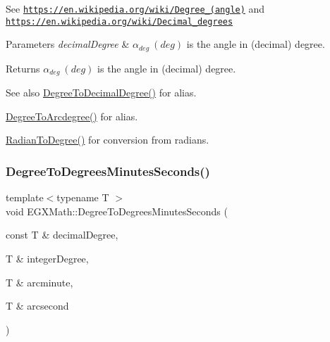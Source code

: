 See \href{https://en.wikipedia.org/wiki/Degree_(angle)}{\tt https\+://en.\+wikipedia.\+org/wiki/\+Degree\+\_\+(angle)} and \href{https://en.wikipedia.org/wiki/Decimal_degrees}{\tt https\+://en.\+wikipedia.\+org/wiki/\+Decimal\+\_\+degrees} 
\begin{DoxyParams}{Parameters}
{\em decimal\+Degree} & $\alpha_{deg}\ (deg)$ is the angle in (decimal) degree. \\
\hline
\end{DoxyParams}
\begin{DoxyReturn}{Returns}
$\alpha_{deg}\ (deg)$ is the angle in (decimal) degree. 
\end{DoxyReturn}
\begin{DoxySeeAlso}{See also}
\mbox{\hyperlink{group___e_g_x_math-_angle_conversions-_degree_ga568afc1d436d425bf5d4edea584aee08}{Degree\+To\+Decimal\+Degree()}} for alias. 

\mbox{\hyperlink{group___e_g_x_math-_angle_conversions-_degree_gac1b5f3b68f66c77a6df4ceef842c9b19}{Degree\+To\+Arcdegree()}} for alias. 

\mbox{\hyperlink{group___e_g_x_math-_angle_conversions-_radian_ga25bbce6cdc1c3621f2a158d320e3bc45}{Radian\+To\+Degree()}} for conversion from radians. 
\end{DoxySeeAlso}
\mbox{\label{group___e_g_x_math-_angle_conversions-_degree_ga859585939255d52d010c780c68eb6e23}} 
\subsubsection{\texorpdfstring{Degree\+To\+Degrees\+Minutes\+Seconds()}{DegreeToDegreesMinutesSeconds()}}
{\footnotesize\ttfamily template$<$typename T $>$ \\
void E\+G\+X\+Math\+::\+Degree\+To\+Degrees\+Minutes\+Seconds (\begin{DoxyParamCaption}\item[{const T \&}]{decimal\+Degree,  }\item[{T \&}]{integer\+Degree,  }\item[{T \&}]{arcminute,  }\item[{T \&}]{arcsecond }\end{DoxyParamCaption})}



